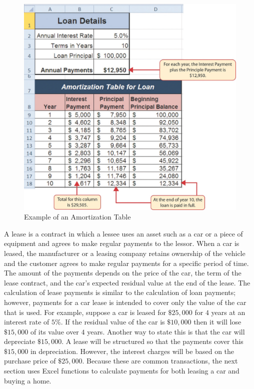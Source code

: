 \begin{figure}[H]
	\centering
	\includegraphics[width=\maxwidth{.95\linewidth}]{gfx/ch02_fig29}
	\caption{Example of an Amortization Table}
	\label{02:fig29}
\end{figure}

A lease is a contract in which a lessee uses an asset such as a car or a piece of equipment and agrees to make regular payments to the lessor. When a car is leased, the manufacturer or a leasing company retains ownership of the vehicle and the customer agrees to make regular payments for a specific period of time. The amount of the payments depends on the price of the car, the term of the lease contract, and the car's expected residual value at the end of the lease. The calculation of lease payments is similar to the calculation of loan payments; however, payments for a car lease is intended to cover only the value of the car that is used. For example, suppose a car is leased for $ \$25,000 $ for $ 4 $ years at an interest rate of $ 5\% $. If the residual value of the car is $ \$10,000 $ then it will lose $ \$15,000 $ of its value over $ 4 $ years. Another way to state this is that the car will depreciate $ \$15,000 $. A lease will be structured so that the payments cover this $ \$15,000 $ in depreciation. However, the interest charges will be based on the purchase price of $ \$25,000 $. Because these are common transactions, the next section uses Excel functions to calculate payments for both leasing a car and buying a home.

